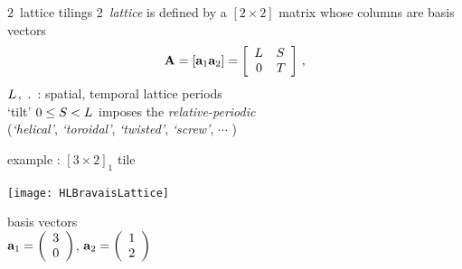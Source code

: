 \begin{frame}{$2$\dmn\ lattice tilings}
2\dmn\ {\color{blue}\emph{lattice}} is
defined by a $[2\times2]$ {\color{blue}\fundPip} matrix whose columns are basis vectors
\[
\mathbf{A} =
\left[ \mathbf{a}_{1} \mathbf{a}_{2} \right]
 =
\left[
\begin{array}{cc}
{\ensuremath{L_{}}} & {S_{}} \\
0 & {T_{}}
\end{array}
\right]
\,,
\]
${L_{}}$, $\period{}$ : spatial, temporal
lattice periods\\
`tilt'  $0\leq{\ensuremath{S_{}}}<{L_{}}$ imposes the
{\color{blue}\emph{relative-periodic}}\\
(\emph{`helical'}, \emph{`toroidal'},
\emph{`twisted'}, \emph{`screw'},  $\cdots$
) {\bcs}

    \begin{block}{example : $[3\!\times\!2]_1$ tile}
\begin{center}
            \begin{minipage}[c]{0.32\textwidth}\begin{center}
\texttt{[image: HLBravaisLattice]}
            \end{center}\end{minipage}
            \hspace{2ex}
            \begin{minipage}[c]{0.46\textwidth}
basis vectors
\\

${\bf a}_1=\left(
 \begin{array}{c}
 3\\
 0
 \end{array}
 \right)$,
${\bf a}_2=\left(
 \begin{array}{c}
 1\\
 2
 \end{array}
 \right)$
            \end{minipage}


\end{center}
    \end{block}
\end{frame} %

